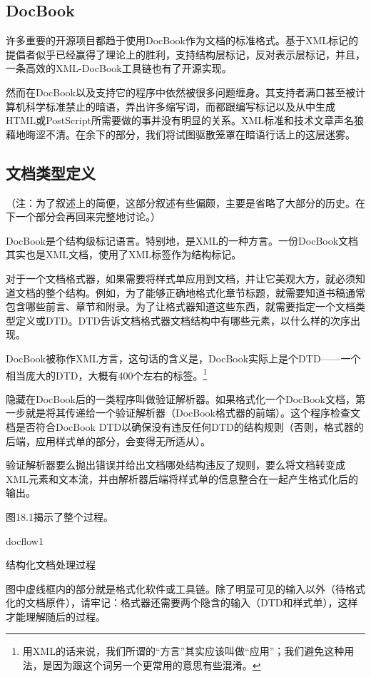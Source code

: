 \documentclass[12pt,oneside]{ctexbook}
\begin{document}
\begin{common-format}
\section{DocBook}
许多重要的开源项目都趋于使用DocBook作为文档的标准格式。基于XML标记的提倡者似乎已经赢得了理论上的胜利，支持结构层标记，反对表示层标记，并且，一条高效的XML-DocBook工具链也有了开源实现。

然而在DocBook以及支持它的程序中依然被很多问题缠身。其支持者满口甚至被计算机科学标准禁止的暗语，弄出许多缩写词，而都跟编写标记以及从中生成HTML或PostScript所需要做的事并没有明显的关系。XML标准和技术文章声名狼藉地晦涩不清。在余下的部分，我们将试图驱散笼罩在暗语行话上的这层迷雾。

\subsection{文档类型定义}
（注：为了叙述上的简便，这部分叙述有些偏颇，主要是省略了大部分的历史。在下一个部分会再回来完整地讨论。）

DocBook是个结构级标记语言。特别地，是XML的一种方言。一份DocBook文档其实也是XML文档，使用了XML标签作为结构标记。

对于一个文档格式器，如果需要将样式单应用到文档，并让它美观大方，就必须知道文档的整个结构。例如，为了能够正确地格式化章节标题，就需要知道书稿通常包含哪些前言、章节和附录。为了让格式器知道这些东西，就需要指定一个文档类型定义或DTD。DTD告诉文档格式器文档结构中有哪些元素，以什么样的次序出现。

DocBook被称作XML方言，这句话的含义是，DocBook实际上是个DTD——一个相当庞大的DTD，大概有400个左右的标签。\footnote{用XML的话来说，我们所谓的“方言”其实应该叫做“应用”；我们避免这种用法，是因为跟这个词另一个更常用的意思有些混淆。}

隐藏在DocBook后的一类程序叫做验证解析器。如果格式化一个DocBook文档，第一步就是将其传递给一个验证解析器（DocBook格式器的前端）。这个程序检查文档是否符合DocBook DTD以确保没有违反任何DTD的结构规则（否则，格式器的后端，应用样式单的部分，会变得无所适从）。

验证解析器要么抛出错误并给出文档哪处结构违反了规则，要么将文档转变成XML元素和文本流，并由解析器后端将样式单的信息整合在一起产生格式化后的输出。

图18.1揭示了整个过程。
\begin{linefig}[0.8]{docflow1}
\caption{结构化文档处理过程}
\label{fig:docflow1}
\end{linefig}

图中虚线框内的部分就是格式化软件或工具链。除了明显可见的输入以外（待格式化的文档原件），请牢记：格式器还需要两个隐含的输入（DTD和样式单），这样才能理解随后的过程。


\end{common-format}
\end{document}

